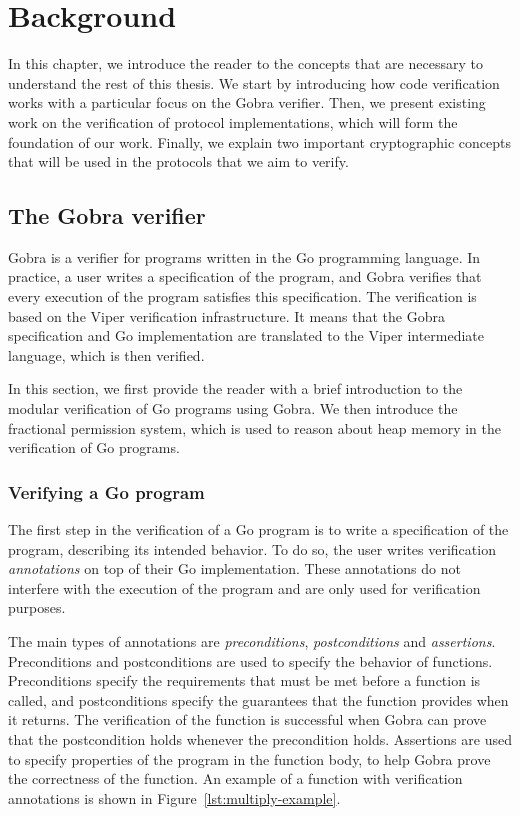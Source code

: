 \chapter{Background}

In this chapter, we introduce the reader to the concepts that are necessary to understand the rest of this thesis.
We start by introducing how code verification works with a particular focus on the Gobra verifier.
Then, we present existing work on the verification of protocol implementations, which will form the foundation of our work.
Finally, we explain two important cryptographic concepts that will be used in the protocols that we aim to verify.

\section{The Gobra verifier}
\label{sec:the-gobra-verifier}

Gobra is a verifier for programs written in the Go programming language.
In practice, a user writes a specification of the program, and Gobra verifies that every execution of the program satisfies this specification.
The verification is based on the Viper verification infrastructure. It means that the Gobra specification and Go implementation are translated to the Viper intermediate language, which is then verified.

In this section, we first provide the reader with a brief introduction to the modular verification of Go programs using Gobra.
We then introduce the fractional permission system, which is used to reason about heap memory in the verification of Go programs.

\subsection{Verifying a Go program}
\label{sec:verifying-a-go-program}

The first step in the verification of a Go program is to write a specification of the program, describing its intended behavior.
To do so, the user writes verification \emph{annotations} on top of their Go implementation.
These annotations do not interfere with the execution of the program and are only used for verification purposes.

The main types of annotations are \emph{preconditions}, \emph{postconditions} and \emph{assertions}.
Preconditions and postconditions are used to specify the behavior of functions. Preconditions specify the requirements that must be met before a function is called, and postconditions specify the guarantees that the function provides when it returns.
The verification of the function is successful when Gobra can prove that the postcondition holds whenever the precondition holds.
Assertions are used to specify properties of the program in the function body, to help Gobra prove the correctness of the function.
An example of a function with verification annotations is shown in Figure~\ref{lst:multiply-example}.

